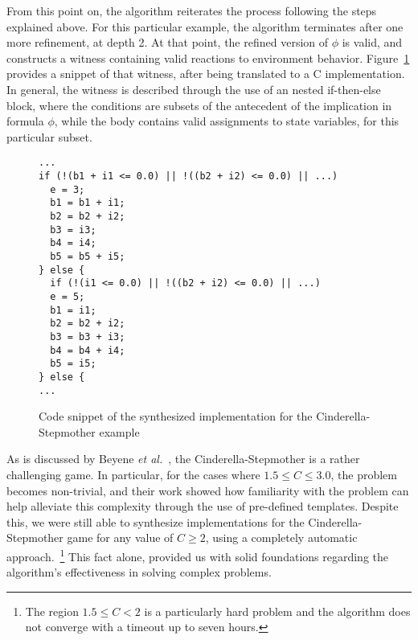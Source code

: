 From this point on, the algorithm reiterates the process following the steps
explained above. For this particular example, the algorithm terminates after one
more refinement, at depth 2. At that point, the refined version of
$\phi$ is valid, and \aeval constructs a witness containing valid reactions to
environment behavior. Figure~\ref{fg:witness} provides a snippet of
that witness, after being translated to a C implementation. 
In general,
the witness is described through the use of an nested if-then-else block, where the conditions are subsets of the antecedent of
the implication in formula $\phi$, while the body contains valid assignments to
state variables, for this particular subset.


\begin{figure}[!t]
\centering
 \begin{Verbatim}[fontsize=\footnotesize]
...
if (!(b1 + i1 <= 0.0) || !((b2 + i2) <= 0.0) || ...)
  e = 3;
  b1 = b1 + i1;
  b2 = b2 + i2;
  b3 = i3;
  b4 = i4;
  b5 = b5 + i5;
} else {
  if (!(i1 <= 0.0) || !((b2 + i2) <= 0.0) || ...)
  e = 5;
  b1 = i1;
  b2 = b2 + i2;
  b3 = b3 + i3;
  b4 = b4 + i4;
  b5 = i5;
} else {
...
 \end{Verbatim}
\caption{Code snippet of the synthesized implementation for the Cinderella-Stepmother
example}
\label{fg:witness}
\end{figure}

As is discussed by Beyene \textit{et al.}~\cite{beyene2014constraint}, the
Cinderella-Stepmother is a rather challenging game. In particular, for the
cases where $1.5 \leq C \leq 3.0$, the problem becomes non-trivial, and their
work showed how familiarity with the problem can help alleviate this complexity
through the use of pre-defined templates. Despite this, we were still
able to synthesize implementations for the Cinderella-Stepmother game for any
value of $C \geq 2$, using a completely automatic approach.~\footnote{The region $1.5\leq C < 2$ is a particularly hard problem and the algorithm does not converge with a timeout up to seven hours.} This fact alone,
provided us with solid foundations regarding the algorithm's effectiveness in
solving complex problems.

